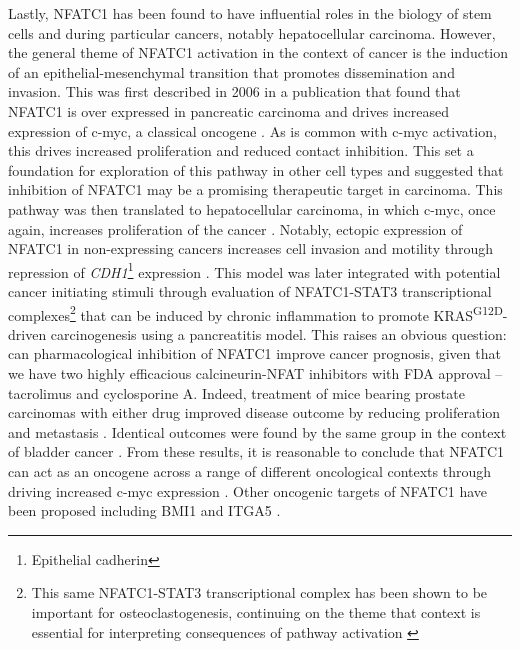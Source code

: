 Lastly, NFATC1 has been found to have influential roles in the biology of stem cells and during particular cancers, notably hepatocellular carcinoma. However, the general theme of NFATC1 activation in the context of cancer is the induction of an epithelial\hyp{}mesenchymal transition that promotes dissemination and invasion. This was first described in 2006 in a publication that found that NFATC1 is over expressed in pancreatic carcinoma and drives increased expression of c\hyp{}myc, a classical oncogene \citep{Buchholz2006, Eerola2019}. As is common with c\hyp{}myc activation, this drives increased proliferation and reduced contact inhibition. This set a foundation for exploration of this pathway in other cell types and suggested that inhibition of NFATC1 may be a promising therapeutic target in carcinoma. This pathway was then translated to hepatocellular carcinoma, in which c\hyp{}myc, once again, increases proliferation of the cancer \citep{Wang2012}. Notably, ectopic expression of NFATC1 in non\hyp{}expressing cancers increases cell invasion and motility through repression of \textit{CDH1}\footnote{Epithelial cadherin} expression \citep{Oikawa2013}. This model was later integrated with potential cancer initiating stimuli through evaluation of NFATC1\hyp{}STAT3 transcriptional complexes\footnote{This same NFATC1\hyp{}STAT3 transcriptional complex has been shown to be important for osteoclastogenesis, continuing on the theme that context is essential for interpreting consequences of pathway activation \citep{Baumgart2014}} that can be induced by chronic inflammation to promote KRAS\textsuperscript{G12D}\hyp{}driven carcinogenesis using a pancreatitis model. This raises an obvious question: can pharmacological inhibition of NFATC1 improve cancer prognosis, given that we have two highly efficacious calcineurin\hyp{}NFAT inhibitors with FDA approval -- tacrolimus and cyclosporine A. Indeed, treatment of mice bearing prostate carcinomas with either drug improved disease outcome by reducing proliferation and metastasis \citep{Kawahara2015a}. Identical outcomes were found by the same group in the context of bladder cancer \citep{Kawahara2015b}. From these results, it is reasonable to conclude that NFATC1 can act as an oncogene across a range of different oncological contexts through driving increased c\hyp{}myc expression \citep{Buchholz2006, Flockhart2009, Seifert2009, Oikawa2013, Kawahara2015a, Kawahara2015b, Liu2021b}. Other oncogenic targets of NFATC1 have been proposed including BMI1 \citep{Wu2019} and ITGA5 \citep{Eerola2019}. 

